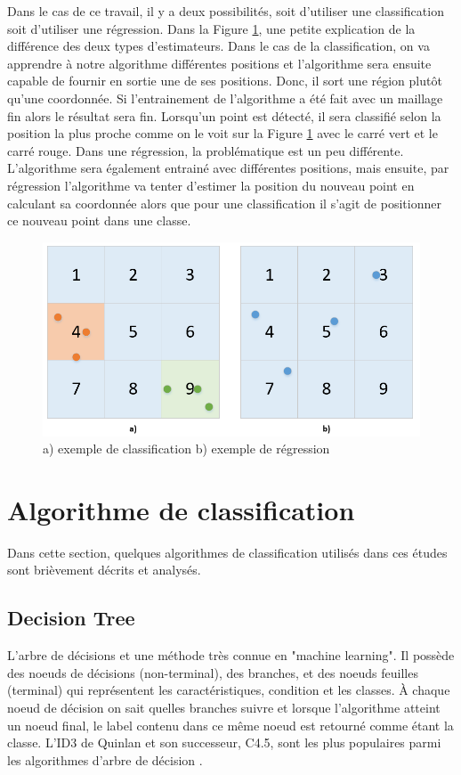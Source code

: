 Dans le cas de ce travail, il y a deux possibilités, soit d'utiliser une classification soit d'utiliser une régression. Dans la Figure \ref{fig:ClassReg}, une petite explication de la différence des deux types d'estimateurs. Dans le cas de la classification, on va apprendre à notre algorithme différentes positions et l'algorithme sera ensuite capable de fournir en sortie une de ses positions. Donc, il sort une région plutôt qu'une coordonnée. Si l'entrainement de l'algorithme a été fait avec un maillage fin alors le résultat sera fin. Lorsqu'un point est détecté, il sera classifié selon la position la plus proche comme on le voit sur la Figure \ref{fig:ClassReg} avec le carré vert et le carré rouge. Dans une régression, la problématique est un peu différente. L'algorithme sera également entrainé avec différentes positions, mais ensuite, par régression l'algorithme va tenter d'estimer la position du nouveau point en calculant sa coordonnée alors que pour une classification il s’agit de positionner ce nouveau point dans une classe. 

\begin{figure}[htp]
 \begin{center}
  \includegraphics[scale=0.5]{figures/ClassReg.png}
  \caption{a) exemple de classification  b) exemple de régression}
  \label{fig:ClassReg} %
 \end{center}
\end{figure}

\section{Algorithme de classification}
Dans cette section, quelques algorithmes de classification utilisés dans ces études \cite{ML_indoor} \cite{CP_RSS} sont brièvement décrits et analysés.

\subsection{Decision Tree}
L'arbre de décisions et une méthode très connue en "machine learning". Il possède des noeuds de décisions (non-terminal), des branches, et des noeuds feuilles (terminal) qui représentent les caractéristiques, condition et les classes. À chaque noeud de décision on sait quelles branches suivre et lorsque l'algorithme atteint un noeud final, le label contenu dans ce même noeud est retourné comme étant la classe. 
L’ID3 de Quinlan et son successeur, C4.5, sont les plus populaires parmi les algorithmes d’arbre de décision \cite{C4_5}.


